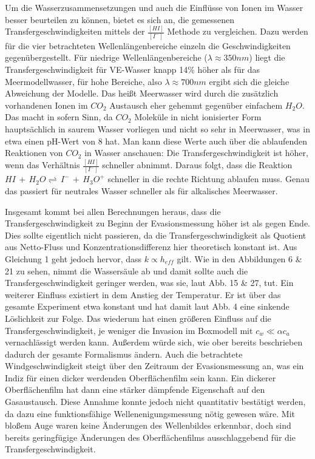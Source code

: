 \documentclass[12pt]{article}
\begin{document}
Um die Wasserzusammensetzungen und auch die Einflüsse von Ionen im Wasser besser beurteilen zu können, bietet es sich an, die gemessenen Transfergeschwindigkeiten mittels der $\frac{[HI]}{[I^-]}$ Methode zu vergleichen. Dazu werden für die vier betrachteten Wellenlängenbereiche einzeln die Geschwindigkeiten gegenübergestellt.
Für niedrige Wellenlängenbereiche ($\lambda \approx 350 nm$) liegt die Transfergeschwindigkeit für VE-Wasser knapp 14\% höher als für das Meermodellwasser, für hohe Bereiche, also $\lambda \approx 700 nm$ ergibt sich die gleiche Abweichung der Modelle. Das heißt Meerwasser wird durch die zusätzlich vorhandenen Ionen im $CO_2$ Austausch eher gehemmt gegenüber einfachem $H_2O$.
Das macht in sofern Sinn, da $CO_2$ Moleküle in nicht ionisierter Form hauptsächlich in saurem Wasser vorliegen und nicht so sehr in Meerwasser, was in etwa einen pH-Wert von 8 hat.
Man kann diese Werte auch über die ablaufenden Reaktionen von $CO_2$ in Wasser anschauen:
Die Transfergeschwindigkeit ist höher, wenn das Verhältnis $\frac{[HI]}{[I^-]}$ schneller abnimmt. Daraus folgt, dass die Reaktion $HI \, + \, H_2O \rightleftharpoons \, I^- \, + \, H_3O^+$ schneller in die rechte Richtung ablaufen muss. Genau das passiert für neutrales Wasser schneller als für alkalisches Meerwasser.

Insgesamt kommt bei allen Berechnungen heraus, dass die Transfergeschwindigkeit zu Beginn der Evasionsmessung höher ist als gegen Ende. Dies sollte eigentlich nicht passieren, da die Transfergeschwindigkeit als Quotient aus Netto-Fluss und Konzentrationsdifferenz hier theoretisch konstant ist. Aus Gleichung 1 geht jedoch hervor, dass $k \propto h_{eff}$ gilt.
Wie in den Abbildungen 6 \& 21 zu sehen, nimmt die Wassersäule ab und damit sollte auch die Transfergeschwindigkeit geringer werden, was sie, laut Abb. 15 \& 27, tut.
Ein weiterer Einfluss existiert in dem Anstieg der Temperatur. Er ist über das gesamte Experiment etwa konstant und hat damit laut \cite{jaehne} Abb. 4 eine sinkende Löslichkeit zur Folge. Das wiederum hat einen größeren Einfluss auf die Transfergeschwindigkeit, je weniger die Invasion im Boxmodell mit $c_w \ll \alpha c_a $ vernachlässigt werden kann. Außerdem würde sich, wie ober bereits beschrieben dadurch der gesamte Formalismus ändern.
Auch die betrachtete Windgeschwindigkeit steigt über den Zeitraum der Evasionsmessung an, was ein Indiz für einen dicker werdenden Oberflächenfilm sein kann. Ein dickerer Oberflächenfilm hat dann eine stärker dämpfende Eigenschaft auf den Gasaustausch. Diese Annahme konnte jedoch nicht quantitativ bestätigt werden, da dazu eine funktionsfähige Wellenenigungsmessung nötig gewesen wäre. Mit bloßem Auge waren keine Änderungen des Wellenbildes erkennbar, doch sind bereits geringfügige Änderungen des Oberflächenfilms ausschlaggebend für die Transfergeschwindigkeit.
\end{document}

